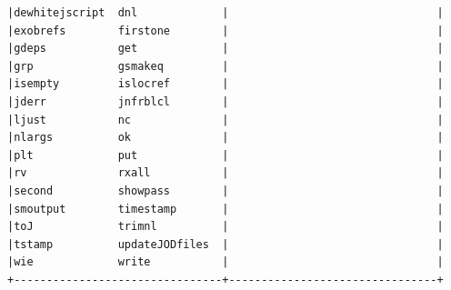 \documentclass[11pt,letter,landscape]{article}
\begin{document}
\begin{Verbatim}[commandchars=\\\{\}]
|dewhitejscript  dnl             |                                |
|exobrefs        firstone        |                                |
|gdeps           get             |                                |
|grp             gsmakeq         |                                |
|isempty         islocref        |                                |
|jderr           jnfrblcl        |                                |
|ljust           nc              |                                |
|nlargs          ok              |                                |
|plt             put             |                                |
|rv              rxall           |                                |
|second          showpass        |                                |
|smoutput        timestamp       |                                |
|toJ             trimnl          |                                |
|tstamp          updateJODfiles  |                                |
|wie             write           |                                |
+--------------------------------+--------------------------------+

    \end{Verbatim}


    
    
    
    
\end{document}
